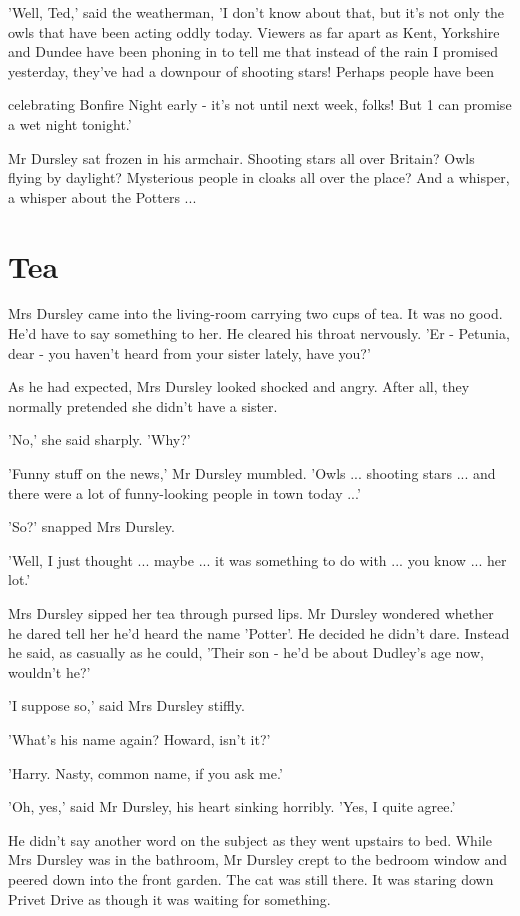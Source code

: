 \documentclass[twoside, openany]{report}
\begin{document}
'Well, Ted,' said the weatherman, 'I don't know about that, but 
it's not only the owls that have been acting oddly today. Viewers as 
far apart as Kent, Yorkshire and Dundee have been phoning in 
to tell me that instead of the rain I promised yesterday, they've 
had a downpour of shooting stars! Perhaps people have been 


celebrating Bonfire Night early - it's not until next week, folks! 
But 1 can promise a wet night tonight.' 

Mr Dursley sat frozen in his armchair. Shooting stars all over 
Britain? Owls flying by daylight? Mysterious people in cloaks all 
over the place? And a whisper, a whisper about the Potters ... 

\section{Tea}
Mrs Dursley came into the living-room carrying two cups of 
tea. It was no good. He'd have to say something to her. He cleared 
his throat nervously. 'Er - Petunia, dear - you haven't heard from 
your sister lately, have you?' 

As he had expected, Mrs Dursley looked shocked and angry. 
After all, they normally pretended she didn't have a sister. 

'No,' she said sharply. 'Why?' 

'Funny stuff on the news,' Mr Dursley mumbled. 'Owls ... 
shooting stars ... and there were a lot of funny-looking people in 
town today ...' 

'So?' snapped Mrs Dursley. 

'Well, I just thought ... maybe ... it was something to do with ... 
you know ... her lot.' 

Mrs Dursley sipped her tea through pursed lips. Mr Dursley 
wondered whether he dared tell her he'd heard the name 'Potter'. 
He decided he didn't dare. Instead he said, as casually as he could, 
'Their son - he'd be about Dudley's age now, wouldn't he?' 

'I suppose so,' said Mrs Dursley stiffly. 

'What's his name again? Howard, isn't it?' 

'Harry. Nasty, common name, if you ask me.' 

'Oh, yes,' said Mr Dursley, his heart sinking horribly. 'Yes, I 
quite agree.' 

He didn't say another word on the subject as they went upstairs 
to bed. While Mrs Dursley was in the bathroom, Mr Dursley crept 
to the bedroom window and peered down into the front garden. 
The cat was still there. It was staring down Privet Drive as though 
it was waiting for something. 
\end{document}
